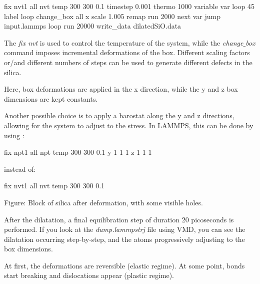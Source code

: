 \begin{lcverbatim}
fix nvt1 all nvt temp 300 300 0.1
timestep 0.001
thermo 1000
variable var loop 45
label loop
change_box all x scale 1.005 remap
run 2000
next var
jump input.lammps loop
run 20000
write_data dilatedSiO.data
\end{lcverbatim}

\noindent The \textit{fix nvt} is used
to control the temperature of the system, while the \textit{change$\_$box} command
imposes incremental deformations of the box.
Different scaling factors or/and different numbers of 
steps can be used to generate different defects in the silica.

\begin{tcolorbox}[colback=mylightblue!5!white,colframe=mylightblue!75!black,title=On using barostat during deformation]

\vspace{0.25cm} \noindent Here, box deformations are applied in the x direction, while the 
y and z box dimensions are kept constants. 

\vspace{0.25cm} \noindent Another possible choice is to apply a barostat along the y and z 
directions, allowing for the system to adjust to the stress. In LAMMPS, 
this can be done by using :

\begin{lcverbatim}
fix npt1 all npt temp 300 300 0.1 y 1 1 1 z 1 1 1
\end{lcverbatim}

\noindent instead of:

\begin{lcverbatim}
fix nvt1 all nvt temp 300 300 0.1
\end{lcverbatim}

\noindent \end{tcolorbox}

\vspace{0.25cm} Figure: Block of silica after deformation, with some visible holes.

\vspace{0.25cm} \noindent After the dilatation, a final equilibration step of duration 20
picoseconds is performed. If you look at the \textit{dump.lammpstrj} file
using VMD, you can see the dilatation occurring step-by-step, and the
atoms progressively adjusting to the box dimensions. 

\vspace{0.25cm} \noindent At first, the deformations
are reversible (elastic regime). At some point, bonds
start breaking and dislocations appear (plastic regime). 

